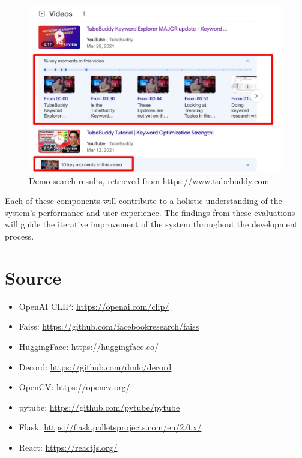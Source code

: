 \documentclass[11pt]{article}
\begin{document}
\begin{enumerate}
    \begin{figure}[h]
        \centering
        \includegraphics[width=\textwidth]{1.jpg}
        \caption{Demo search results, retrieved from \url{https://www.tubebuddy.com}}
        \end{figure}
    
\end{enumerate}
Each of these components will contribute to a holistic understanding of the system's performance and user experience. The findings from these evaluations will guide the iterative improvement of the system throughout the development process.

\section{Source}
\begin{itemize}
    \item OpenAI CLIP: \url{https://openai.com/clip/}
    \item Faiss: \url{https://github.com/facebookresearch/faiss}
    \item HuggingFace: \url{https://huggingface.co/}
    \item Decord: \url{https://github.com/dmlc/decord}
    \item OpenCV: \url{https://opencv.org/}
    \item pytube: \url{https://github.com/pytube/pytube}
    \item Flask: \url{https://flask.palletsprojects.com/en/2.0.x/}
    \item React: \url{https://reactjs.org/}
\end{itemize}
\end{document}
